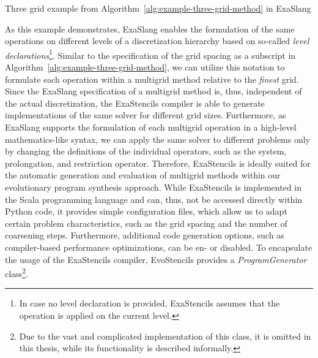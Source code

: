 \begin{listing}
	\inputminted[fontsize=\footnotesize,breaklines]{scala}{evostencils/code_generation/three_grid_example.exa3}
	\caption{Three grid example from Algorithm~\ref{alg:example-three-grid-method} in ExaSlang}
	\label{code:exaslang-example}
\end{listing}
As this example demonstrates, ExaSlang enables the formulation of the same operations on different levels of a discretization hierarchy based on so-called \emph{level declarations}\footnote{In case no level declaration is provided, ExaStencils assumes that the operation is applied on the current level.}.
Similar to the specification of the grid spacing as a subscript in Algorithm~\ref{alg:example-three-grid-method}, we can utilize this notation to formulate each operation within a multigrid method relative to the \emph{finest} grid.
Since the ExaSlang specification of a multigrid method is, thus, independent of the actual discretization, the ExaStencils compiler is able to generate implementations of the same solver for different grid sizes.
Furthermore, as ExaSlang supports the formulation of each multigrid operation in a high-level mathematics-like syntax, we can apply the same solver to different problems only by changing the definitions of the individual operators, such as the system, prolongation, and restriction operator.
Therefore, ExaStencils is ideally suited for the automatic generation and evaluation of multigrid methods within our evolutionary program synthesis approach.
While ExaStencils is implemented in the Scala programming language and can, thus, not be accessed directly within Python code, it provides simple configuration files, which allow us to adapt certain problem characteristics, such as the grid spacing and the number of coarsening steps.
Furthermore, additional code generation options, such as compiler-based performance optimizations, can be en- or disabled.
To encapsulate the usage of the ExaStencils compiler, EvoStencils provides a \emph{ProgramGenerator} class\footnote{Due to the vast and complicated implementation of this class, it is omitted in this thesis, while its functionality is described informally.}.
